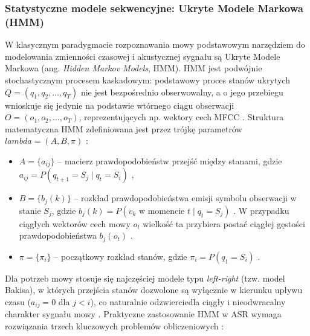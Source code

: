 \subsubsection{Statystyczne modele sekwencyjne: Ukryte Modele Markowa (HMM)}
W klasycznym paradygmacie rozpoznawania mowy podstawowym narzędziem do modelowania zmienności czasowej i akustycznej sygnału są Ukryte Modele Markowa (ang. \textit{Hidden Markov Models}, HMM). HMM jest podwójnie stochastycznym procesem kaskadowym: podstawowy proces stanów ukrytych $Q = (q_1, q_2, \dots, q_T)$ nie jest bezpośrednio obserwowalny, a o jego przebiegu wnioskuje się jedynie na podstawie wtórnego ciągu obserwacji $O = (o_1, o_2, \dots, o_T)$, reprezentujących np. wektory cech MFCC \cite[s.~257, 259]{rabiner1989tutorial}. Struktura matematyczna HMM zdefiniowana jest przez trójkę parametrów $lambda = (A, B, \pi)$ \cite[s.~261]{rabiner1989tutorial}:
\begin{itemize}
\item $A = \{a_{ij}\}$ -- macierz prawdopodobieństw przejść między stanami, gdzie $a_{ij} = P(q_{t+1} = S_j \mid q_t = S_i)$ \cite[s.~260]{rabiner1989tutorial},
\item $B = \{b_j(k)\}$ -- rozkład prawdopodobieństwa emisji symbolu obserwacji w stanie $S_j$, gdzie $b_j(k) = P(v_k \text{ w momencie } t \mid q_t = S_j)$ \cite[s.~261]{rabiner1989tutorial}. W przypadku ciągłych wektorów cech mowy $o_t$ wielkość ta przybiera postać ciągłej gęstości prawdopodobieństwa $b_j(o_t)$ \cite[s.~262, 267]{rabiner1989tutorial}.
\item $\pi = \{\pi_i\}$ -- początkowy rozkład stanów, gdzie $\pi_i = P(q_1 = S_i)$ \cite[s.~261]{rabiner1989tutorial}.


\end{itemize}
Dla potrzeb mowy stosuje się najczęściej modele typu \textit{left-right} (tzw. model Bakisa), w których przejścia stanów dozwolone są wyłącznie w kierunku upływu czasu ($a_{ij} = 0$ dla $j < i$), co naturalnie odzwierciedla ciągły i nieodwracalny charakter sygnału mowy \cite[s.~266]{rabiner1989tutorial}. Praktyczne zastosowanie HMM w ASR wymaga rozwiązania trzech kluczowych problemów obliczeniowych \cite[s.~261]{rabiner1989tutorial}:
